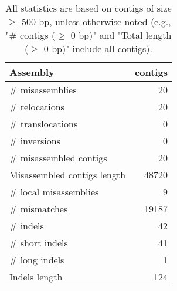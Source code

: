 \documentclass[12pt,a4paper]{article}
\begin{document}
\begin{table}[ht]
\begin{center}
\caption{All statistics are based on contigs of size $\geq$ 500 bp, unless otherwise noted (e.g., "\# contigs ($\geq$ 0 bp)" and "Total length ($\geq$ 0 bp)" include all contigs).}
\begin{tabular}{|l*{1}{|r}|}
\hline
Assembly & contigs \\ \hline
\# misassemblies & 20 \\ \hline
\hspace{5mm}\# relocations & 20 \\ \hline
\hspace{5mm}\# translocations & 0 \\ \hline
\hspace{5mm}\# inversions & 0 \\ \hline
\# misassembled contigs & 20 \\ \hline
Misassembled contigs length & 48720 \\ \hline
\# local misassemblies & 9 \\ \hline
\# mismatches & 19187 \\ \hline
\# indels & 42 \\ \hline
\hspace{5mm}\# short indels & 41 \\ \hline
\hspace{5mm}\# long indels & 1 \\ \hline
Indels length & 124 \\ \hline
\end{tabular}
\end{center}
\end{table}
\end{document}

